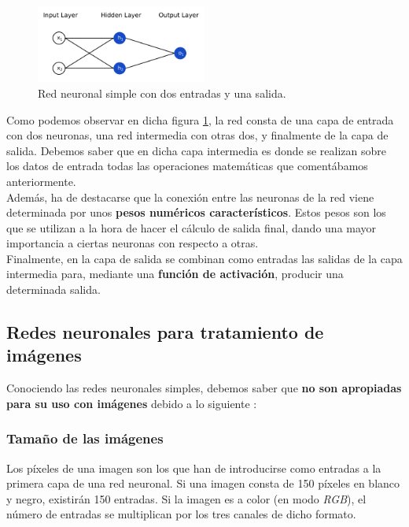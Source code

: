 \documentclass[]{scrartcl}
\begin{document}
		\begin{figure}[h]
			\centering
			\includegraphics[width=0.5\textwidth]{./img/neural-network}
			\caption{Red neuronal simple con dos entradas y una salida.}
			\label{neural-network}
		\end{figure}
	
		Como podemos observar en dicha figura \ref{neural-network}, la red consta de una capa de entrada con dos neuronas, una red intermedia con otras dos, y finalmente de la capa de salida. Debemos saber que en dicha capa intermedia es donde se realizan sobre los datos de entrada todas las operaciones matemáticas que comentábamos anteriormente.\\
		
		Además, ha de destacarse que la conexión entre las neuronas de la red viene determinada por unos \textbf{pesos numéricos característicos}. Estos pesos son los que se utilizan a la hora de hacer el cálculo de salida final, dando una mayor importancia a ciertas neuronas con respecto a otras.\\
		
		Finalmente, en la capa de salida se combinan como entradas las salidas de la capa intermedia para, mediante una \textbf{función de activación}, producir una determinada salida.
		
	\subsection{Redes neuronales para tratamiento de imágenes}
	
		Conociendo las redes neuronales simples, debemos saber que \textbf{no son apropiadas para su uso con imágenes} debido a lo siguiente \cite{intro-convolutional-nn}:
		
		\subsubsection*{Tamaño de las imágenes}
		
			Los píxeles de una imagen son los que han de introducirse como entradas a la primera capa de una red neuronal. Si una imagen consta de 150 píxeles en blanco y negro, existirán 150 entradas. Si la imagen es a color (en modo \textit{RGB}), el número de entradas se multiplican por los tres canales de dicho formato.\\
			 
\end{document}
